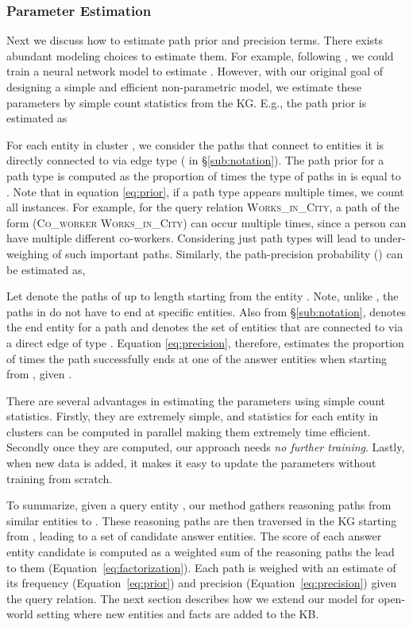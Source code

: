 \documentclass[11pt,a4paper]{article}
\begin{document}
\subsubsection{Parameter Estimation}
\label{sub:param_estimation}
Next we discuss how to estimate path prior and precision terms. There exists abundant modeling choices to estimate them. For example, following \citet{chen2018variational}, we could train a neural network model to estimate . However, with our original goal of designing a simple and efficient non-parametric model, we estimate these parameters by simple count statistics from the KG. E.g., the path prior  is estimated as

For each entity in cluster , we consider the paths that connect  to entities it is directly connected to via edge type  ( in \S\ref{sub:notation}). The path prior for a path type  is computed as the proportion of times the  type of paths in   is equal to . Note that in equation \ref{eq:prior}, if a path type appears multiple times, we count all instances. For example, for the query relation \textsc{Works\_in\_City}, a path of the form (\textsc{Co\_worker}  \textsc{Works\_in\_City}) can occur multiple times, since a person can have multiple different co-workers. Considering just path types will lead to under-weighing of such important paths. Similarly, the path-precision probability () can be estimated as,


Let  denote the paths of up to length  starting from the entity . Note, unlike , the paths in  do not have to end at specific entities. Also from \S\ref{sub:notation},  denotes the end entity for a path  and  denotes the set of entities that are connected to  via a direct edge of type . Equation \ref{eq:precision}, therefore, estimates the proportion of times the path  successfully ends at one of the answer entities when starting from , given . 

There are several advantages in estimating the parameters using simple count statistics. Firstly, they are extremely simple, and statistics for each entity in clusters can be computed in parallel making them extremely time efficient. Secondly once they are computed, our approach needs \emph{no further training}. Lastly, when new data is added, it makes it easy to update the parameters without training from scratch. 

To summarize, given a query entity , our method gathers reasoning paths from  similar entities to . These reasoning paths are then traversed in the KG starting from , leading to a set of candidate answer entities. The score of each answer entity candidate is computed as a weighted sum of the reasoning paths the lead to them (Equation~\ref{eq:factorization}). Each path is weighed with an estimate of its frequency (Equation~\ref{eq:prior}) and precision (Equation~\ref{eq:precision}) given the query relation. The next section describes how we extend our model for open-world setting where new entities and facts are added to the KB.
\end{document}
